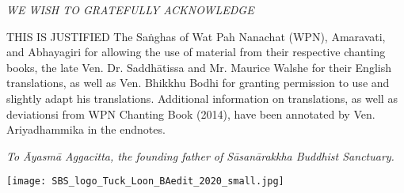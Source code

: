 \cleartorecto
\thispagestyle{empty}

\mbox{}\vfill

{\centering\itshape
WE WISH TO GRATEFULLY ACKNOWLEDGE
}

THIS IS JUSTIFIED
The Saṅghas of Wat Pah Nanachat (WPN), Amaravati, and Abhayagiri for allowing the use of material from their respective chanting books, the late Ven. Dr. Saddhātissa and Mr. Maurice Walshe for their English translations, as well as Ven. Bhikkhu Bodhi for granting permission to use and slightly adapt his translations.
Additional information on translations, as well as deviationsi from WPN Chanting Book (2014), have been annotated by Ven. Ariyadhammika in the endnotes.

\clearpage

{\centering\itshape
To Āyasmā Aggacitta, the founding father of
Sāsanārakkha Buddhist Sanctuary.

\texttt{[image: SBS\_logo\_Tuck\_Loon\_BAedit\_2020\_small.jpg]}
}

\vfill\mbox{}

\vspace*{5\baselineskip}
